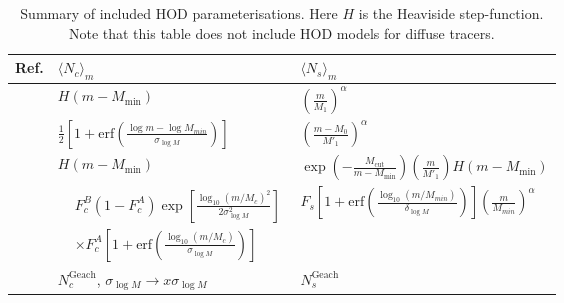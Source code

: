 \documentclass[5p,aas_macros]{elsarticle}
\newcommand{\Nc}{\langle N_c \rangle}
\newcommand{\Ns}{\langle N_s \rangle}
\begin{document}
\begin{table}
\small
\centering
\begin{tabu}{X[1.7l]X[4l]X[4l]}
\toprule[0.05cm] 
Ref. & $\Nc_m$ & $\Ns_m$ \\
\toprule[0.05cm]
      
        \citet{Zehavi2005} & $H(m-M_\text{min})$ & $\left(\frac{m}{M_1}\right)^\alpha$ \\ \midrule

        \citet{Zheng2005} & $\frac{1}{2}\left[1+\text{erf}\left(\frac{\log m-\log M_{min}}{\sigma_{\log M}}\right)\right]$ & $\left(\frac{m-M_0}{M'_1}\right)^\alpha$ \\ \midrule

        \citet{Tinker2005} & $H(m-M_\text{min})$ & $\exp\left(-\frac{M_\text{cut}}{m-M_\text{min}}\right)\left(\frac{m}{M'_1}\right)H(m-M_\text{min})$ \\ \midrule
                                        
        \citet{Geach2012} & $\begin{aligned}&F_c^B(1-F_c^A)\exp \left[\frac{\log_{10}(m/M_c)^2}{2\sigma^2_{\log M}}\right] \\ &\times F_c^A \left[1+ \text{erf} \left(\frac{\log_{10}(m/M_c)}{\sigma_{\log M}}\right)\right]\end{aligned}$ & $F_s \left[1 + \text{erf} \left(\frac{\log_{10}(m/M_{min})}{\delta_{\log M}}\right)\right]\left(\frac{m}{M_{min}}\right)^\alpha$ \\ \midrule
          
         \citet{Contreras2013} & $N_c^\text{Geach}$, $\sigma_{\log M} \rightarrow x\sigma_{\log M}$ & $N_s^\text{Geach}$ \\
         \bottomrule[0.05cm]
\end{tabu}
\caption[Summary of included HOD parameterisations]{Summary of included HOD parameterisations. Here $H$ is the Heaviside step-function. Note that this table does not include HOD models for diffuse tracers.}
\label{tab:models_hod}
\end{table}
\end{document}
